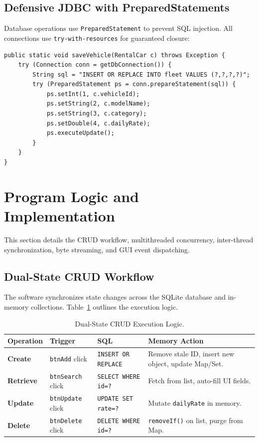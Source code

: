\documentclass[11pt,a4paper]{article}
\begin{document}
\subsection{Defensive JDBC with PreparedStatements}
Database operations use \texttt{PreparedStatement} to prevent SQL injection. All connections use \texttt{try-with-resources} for guaranteed closure:
\begin{lstlisting}[caption={Parameterized JDBC Insertion}]
public static void saveVehicle(RentalCar c) throws Exception {
    try (Connection conn = getDbConnection()) {
        String sql = "INSERT OR REPLACE INTO fleet VALUES (?,?,?,?)";
        try (PreparedStatement ps = conn.prepareStatement(sql)) {
            ps.setInt(1, c.vehicleId);
            ps.setString(2, c.modelName);
            ps.setString(3, c.category);
            ps.setDouble(4, c.dailyRate);
            ps.executeUpdate();
        }
    }
}
\end{lstlisting}

\newpage
\section{Program Logic and Implementation}
\label{sec:logic}

This section details the CRUD workflow, multithreaded concurrency, inter-thread synchronization, byte streaming, and GUI event dispatching.

\subsection{Dual-State CRUD Workflow}
The software synchronizes state changes across the SQLite database and in-memory collections. Table~\ref{tab:crud_logic} outlines the execution logic.

\begin{table}[h!]
\centering
\small
\begin{tabularx}{\textwidth}{l p{2.8cm} p{4.0cm} p{4.5cm}}
\toprule
\textbf{Operation} & \textbf{Trigger} & \textbf{SQL} & \textbf{Memory Action} \\
\midrule
\textbf{Create} & \texttt{btnAdd} click & \texttt{INSERT OR REPLACE} & Remove stale ID, insert new object, update Map/Set. \\
\addlinespace
\textbf{Retrieve} & \texttt{btnSearch} click & \texttt{SELECT WHERE id=?} & Fetch from list, auto-fill UI fields. \\
\addlinespace
\textbf{Update} & \texttt{btnUpdate} click & \texttt{UPDATE SET rate=?} & Mutate \texttt{dailyRate} in memory. \\
\addlinespace
\textbf{Delete} & \texttt{btnDelete} click & \texttt{DELETE WHERE id=?} & \texttt{removeIf()} on list, purge from Map. \\
\bottomrule
\end{tabularx}
\caption{Dual-State CRUD Execution Logic.}
\label{tab:crud_logic}
\end{table}
\end{document}
